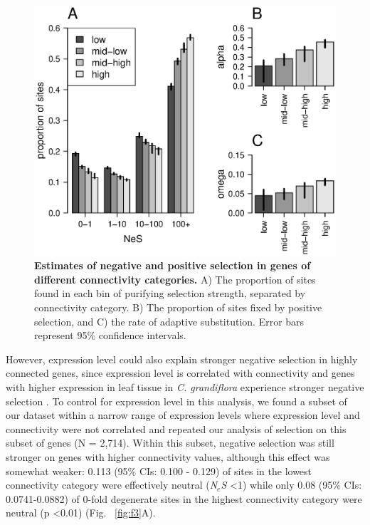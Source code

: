 \begin{figure}[ht!]
\centering
\includegraphics[width=\linewidth]{Ch4Fig2}
\caption{\textbf{ Estimates of negative and positive selection in genes of different connectivity categories.} A) The proportion of sites found in each bin of purifying selection strength, separated by connectivity category. B) The proportion of sites fixed by positive selection, and C) the rate of adaptive substitution. Error bars represent 95\% confidence intervals.}
\label{fig:f2}
\end{figure}

However, expression level could also explain stronger negative selection in highly connected genes, since expression level is correlated with connectivity and genes with higher expression in leaf tissue in \textit{C. grandiflora} experience stronger negative selection \citep{Williamson2014-tf}. To control for expression level in this analysis, we found a subset of our dataset within a narrow range of expression levels where expression level and connectivity were not correlated and repeated our analysis of selection on this subset of genes (N = 2,714). Within this subset, negative selection was still stronger on genes with higher connectivity values, although this effect was somewhat weaker: 0.113 (95\% CIs: 0.100 - 0.129) of sites in the lowest connectivity category were effectively neutral (\textit{N$_{e}$S} \textless 1) while only 0.08 (95\% CIs: 0.0741-0.0882) of 0-fold degenerate sites in the highest connectivity category were neutral (p \textless 0.01) (Fig. ~\ref{fig:f3}A). 

